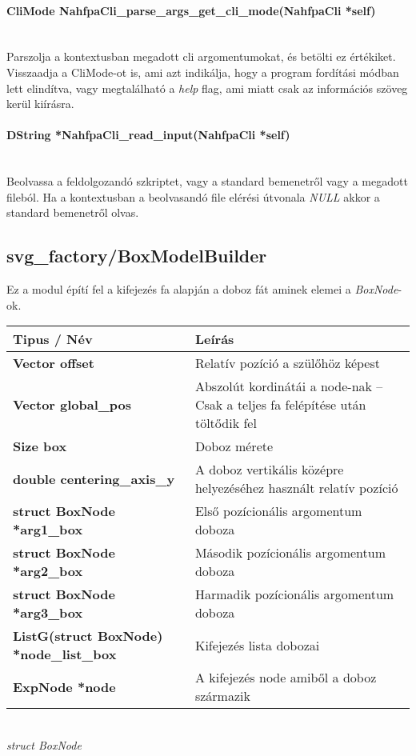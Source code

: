 \documentclass{article}[12pt,a4paper]
\newcommand{\fn}[1]{\paragraph{#1}\mbox{}\\}
\begin{document}
    \fn{CliMode NahfpaCli\_parse\_args\_get\_cli\_mode(NahfpaCli *self)}
    Parszolja a kontextusban megadott cli argomentumokat, és betölti ez értékiket.
    Visszaadja a CliMode-ot is, ami azt indikálja, hogy a program fordítási módban lett elindítva, vagy megtalálható a \textit{help} flag, ami miatt csak az információs szöveg kerül kiírásra.

    \fn{DString *NahfpaCli\_read\_input(NahfpaCli *self)}
    Beolvassa a feldolgozandó szkriptet, vagy a standard bemenetről vagy a megadott fileból.
    Ha a kontextusban a beolvasandó file elérési útvonala \textit{NULL} akkor a standard bemenetről olvas.

    \subsection{svg\_factory/BoxModelBuilder}
    Ez a modul építí fel a kifejezés fa alapján a doboz fát aminek elemei a \textit{BoxNode}-ok.

    \begin{center}
        \begin{tabular}{ | p{5.5cm} || p{5.5cm} | }
            \hline
            \textbf{Tipus / Név} & Leírás \\
            \hline
            \textbf{Vector offset} & Relatív pozíció a szülőhöz képest\\
            \hline
            \textbf{Vector global\_pos} & Abszolút kordinátái a node-nak -- Csak a teljes fa felépítése után töltődik fel\\
            \hline
            \textbf{Size box} & Doboz mérete\\
            \hline
            \textbf{double centering\_axis\_y} & A doboz vertikális középre helyezéséhez használt relatív pozíció\\
            \hline
            \textbf{struct BoxNode *arg1\_box} & Első pozícionális argomentum doboza\\
            \hline
            \textbf{struct BoxNode *arg2\_box} & Második pozícionális argomentum doboza\\
            \hline
            \textbf{struct BoxNode *arg3\_box} & Harmadik pozícionális argomentum doboza\\
            \hline
            \textbf{ListG(struct BoxNode) *node\_list\_box} & Kifejezés lista dobozai\\
            \hline
            \textbf{ExpNode *node} & A kifejezés node amiből a doboz származik\\
            \hline
        \end{tabular}\\
        \textit{struct BoxNode}\\
    \end{center}
\end{document}
